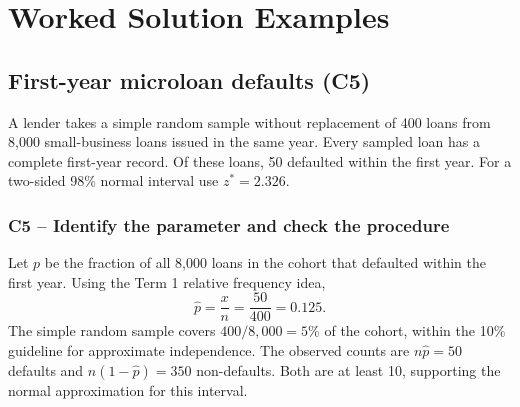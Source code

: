 	\section{Worked Solution Examples}
	\label{sec:worked-solution-examples}


	\subsection{First-year microloan defaults (C5)}
	\label{prob:c5-1}

	A lender takes a simple random sample without replacement of 400 loans from 8,000 small-business loans issued in the same year. Every sampled loan has a complete first-year record. Of these loans, 50 defaulted within the first year. For a two-sided 98\% normal interval use $z^*=2.326$.


	\clearpage

	\label{sol:c5-1-a}
	\subsubsection*{C5 -- Identify the parameter and check the procedure}

	Let $p$ be the fraction of all 8,000 loans in the cohort that defaulted within the first year. Using the Term 1 relative frequency idea,
	\[
	\hat p=\frac{x}{n}=\frac{50}{400}=0.125.
	\]
	The simple random sample covers $400/8{,}000=5\%$ of the cohort, within the 10\% guideline for approximate independence. The observed counts are $n\hat p=50$ defaults and $n(1-\hat p)=350$ non-defaults. Both are at least 10, supporting the normal approximation for this interval.


	\label{sol:c5-1-b}
